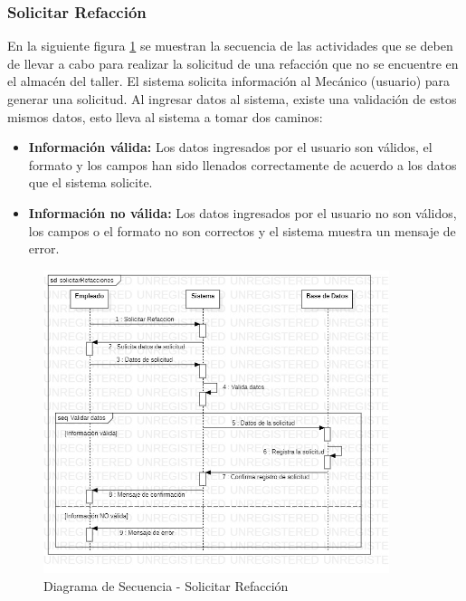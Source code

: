\subsubsection{Solicitar Refacción}
En la siguiente figura \ref{fig:Diagrama de Secuencia - Solicitar Refaccion} se muestran la secuencia de las actividades que se deben de llevar a cabo para realizar la solicitud de una refacción que no se encuentre en el almacén del taller. El sistema solicita información al Mecánico (usuario) para generar una solicitud. Al ingresar datos al sistema, existe una validación de estos mismos datos, esto lleva al sistema a tomar dos caminos: 
\begin{itemize}
	\item \textbf{Información válida:} Los datos ingresados por el usuario son válidos, el formato y los campos han sido llenados correctamente de acuerdo a los datos que el sistema solicite.  
	\item \textbf{Información no válida:} Los datos ingresados por el usuario no son válidos, los campos o el formato no son correctos y el sistema muestra un mensaje de error.
\end{itemize} 
\begin{figure}[!h]
	\centering
	\includegraphics[width=0.9\textwidth]{./diseno/vprocesos/imagenes/solicitarRefacciones}
	\caption{Diagrama de Secuencia - Solicitar Refacción}
	\label{fig:Diagrama de Secuencia - Solicitar Refaccion}
\end{figure}
\clearpage